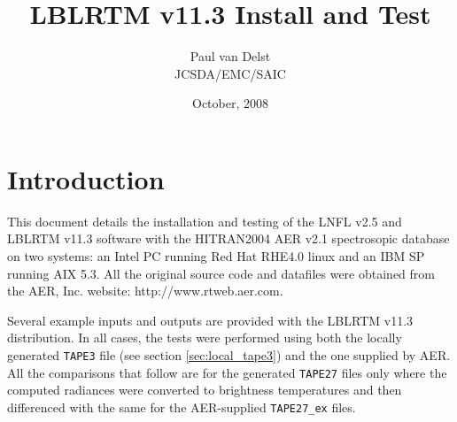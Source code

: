 




\title{LBLRTM v11.3 Install and Test}
\author{Paul van Delst\\JCSDA/EMC/SAIC}
\date{October, 2008}



\maketitle

\draftwatermark


\section{Introduction}
This document details the installation and testing of the LNFL v2.5 and LBLRTM v11.3 software with the HITRAN2004 AER v2.1 spectrosopic database on two systems: an Intel PC running Red Hat RHE4.0 linux and an IBM SP running AIX 5.3. All the original source code and datafiles were obtained from the AER, Inc. website: http://www.rtweb.aer.com.

Several example inputs and outputs are provided with the LBLRTM v11.3 distribution. In all cases, the tests were performed using both the locally generated \texttt{TAPE3} file (see section \ref{sec:local_tape3}) and the one supplied by AER. All the comparisons that follow are for the generated \texttt{TAPE27} files only where the computed radiances were converted to brightness temperatures and then differenced with the same for the AER-supplied \texttt{TAPE27\_ex} files.








\begin{appendix}
\end{appendix}



